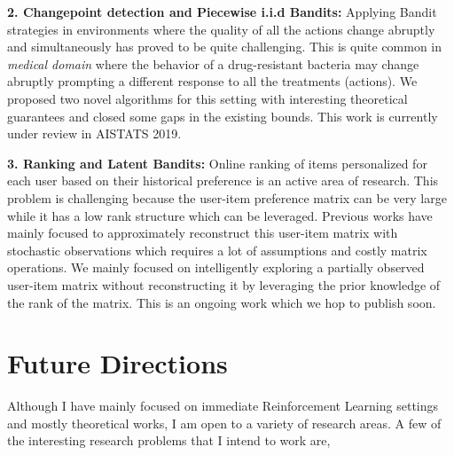 \documentclass[twoside]{article}
\begin{document}
\textbf{2. Changepoint detection and Piecewise i.i.d Bandits:}  Applying Bandit strategies in environments where the quality of all the actions change abruptly and simultaneously has proved to be quite challenging. This is quite common in \textit{medical domain} where the behavior of a drug-resistant bacteria may change abruptly prompting a different response to all the treatments (actions). We proposed two novel algorithms for this setting with interesting theoretical guarantees and closed some gaps in the existing bounds. This work is currently under review in AISTATS 2019. 


\textbf{3. Ranking and Latent Bandits:} Online ranking of items personalized for each user based on their historical preference is an active area of research. This problem is challenging because the user-item preference matrix can be very large while it has a low rank structure which can be leveraged. Previous works have mainly focused to approximately reconstruct this user-item matrix with stochastic observations which requires a lot of assumptions and costly matrix operations. We mainly focused on intelligently exploring a partially observed user-item matrix without reconstructing it by leveraging the prior knowledge of the rank of the matrix. This is an ongoing work which we hop to publish soon.
	 
	
\vspace*{-2em}
\section{Future Directions}
\vspace*{-1em}

Although I have mainly focused on immediate Reinforcement Learning settings and mostly theoretical works, I am open to a variety of research areas. A few of the interesting research problems that I intend to work are,
\end{document}
